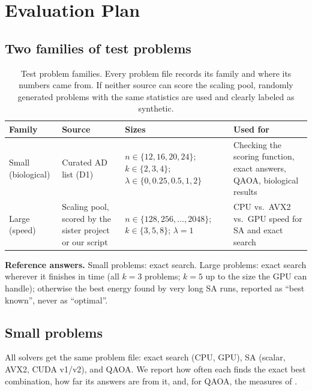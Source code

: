 \section{Evaluation Plan}
\label{app:eval}

\subsection{Two families of test problems}

\begin{table}[ht]
\centering
\small
\begin{tabularx}{\linewidth}{>{\raggedright\arraybackslash}p{1.9cm}>{\raggedright\arraybackslash}p{3.2cm}>{\raggedright\arraybackslash}p{3.6cm}X}
\toprule
Family & Source & Sizes & Used for \\
\midrule
Small (biological) & Curated AD list (D1) & $n\in\{12,16,20,24\}$;\newline $k\in\{2,3,4\}$;\newline $\lambda\in\{0,0.25,0.5,1,2\}$ & Checking the scoring function, exact answers, QAOA, biological results \\
Large (speed) & Scaling pool, scored by the sister project or our script & $n\in\{128,256,\dots,2048\}$;\newline $k\in\{3,5,8\}$; $\lambda=1$ & CPU vs.\ AVX2 vs.\ GPU speed for SA and exact search \\
\bottomrule
\end{tabularx}
\caption{Test problem families. Every problem file records its family and where its numbers came from. If neither source can score the scaling pool, randomly generated problems with the same statistics are used and clearly labeled as synthetic.}
\label{tab:families}
\end{table}

\textbf{Reference answers.} Small problems: exact search. Large problems: exact search wherever it finishes in time (all $k=3$ problems; $k=5$ up to the size the GPU can handle); otherwise the best energy found by very long SA runs, reported as ``best known'', never as ``optimal''.

\subsection{Small problems}

All solvers get the same problem file: exact search (CPU, GPU), SA (scalar, AVX2, CUDA v1/v2), and QAOA. We report how often each finds the exact best combination, how far its answers are from it, and, for QAOA, the measures of .

